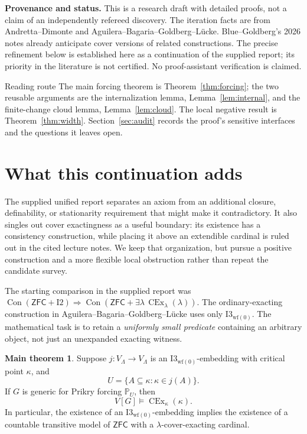 \documentclass[11pt,letterpaper]{article}
\theoremstyle{definition}
\newcommand{\ZFC}{\mathsf{ZFC}}
\newcommand{\CEx}{\operatorname{CEx}}
\newcommand{\Con}{\operatorname{Con}}
\newcommand{\Itwo}{\mathrm{I2}}
\newcommand{\Iwf}{\mathrm{I3}_{\mathrm{wf}(0)}}
\newcommand{\PP}{\mathbb P}
\newtheorem*{maintheorem}{Main theorem}
\begin{document}
\textbf{Provenance and status.} This is a research draft with detailed proofs,
not a claim of an independently refereed discovery. The iteration facts are
from Andretta--Dimonte and Aguilera--Bagaria--Goldberg--L\"ucke. Blue--Goldberg's
2026 notes already anticipate cover versions of related constructions.
The precise refinement below is established here as a continuation of the
supplied report; its priority in the literature is not certified.
No proof-assistant verification is claimed.

\clearpage
\tableofcontents
\vspace{8pt}
\begin{assessment}{Reading route}
The main forcing theorem is Theorem~\ref{thm:forcing}; the two reusable
arguments are the internalization lemma, Lemma~\ref{lem:internal}, and the
finite-change cloud lemma, Lemma~\ref{lem:cloud}. The local negative result
is Theorem~\ref{thm:width}. Section~\ref{sec:audit} records the proof's
sensitive interfaces and the questions it leaves open.
\end{assessment}

\clearpage
\section{What this continuation adds}\label{sec:scope}

The supplied unified report separates an axiom from an additional closure,
definability, or stationarity requirement that might make it contradictory.
It also singles out cover exactingness as a useful boundary: its existence
has a consistency construction, while placing it above an extendible
cardinal is ruled out in the cited lecture notes. We keep that organization,
but pursue a positive construction and a more flexible local obstruction
rather than repeat the candidate survey.\cite{unified,cover}

The starting comparison in the supplied report was
$\Con(\ZFC+\Itwo)\Rightarrow\Con(\ZFC+\exists\lambda\,\CEx_\lambda(\lambda))$.
The ordinary-exacting construction in Aguilera--Bagaria--Goldberg--L\"ucke
uses only $\Iwf$.\cite[Theorem~5.4]{abgl}
The mathematical task is to retain a \emph{uniformly small predicate}
containing an arbitrary object, not just an unexpanded exacting witness.

\begin{maintheorem}
Suppose $j:V_\Lambda\to V_\Lambda$ is an $\Iwf$-embedding with critical
point $\kappa$, and
\[
 U=\{A\subseteq\kappa:\kappa\in j(A)\}.
\]
If $G$ is generic for Prikry forcing $\PP_U$, then
\[
 V[G]\models\CEx_\kappa(\kappa).
\]
In particular, the existence of an $\Iwf$-embedding implies the existence
of a countable transitive model of $\ZFC$ with a $\lambda$-cover-exacting
cardinal.
\end{maintheorem}
\end{document}
